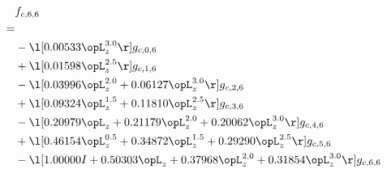 \begin{alignat}{2} 
\label{eq:f_66_0} 
& f_{c,6,6} \nonumber \\ 
 = \\ 
& - \l[  0.00533 \opL_z^{3.0}  \r] g_{c,0,6} \nonumber \\ 
& + \l[  0.01598 \opL_z^{2.5}  \r] g_{c,1,6} \nonumber \\ 
& - \l[  0.03996 \opL_z^{2.0} +  0.06127 \opL_z^{3.0}  \r] g_{c,2,6} \nonumber \\ 
& + \l[  0.09324 \opL_z^{1.5} +  0.11810 \opL_z^{2.5}  \r] g_{c,3,6} \nonumber \\ 
& - \l[  0.20979 \opL_z +  0.21179 \opL_z^{2.0} +  0.20062 \opL_z^{3.0}  \r] g_{c,4,6} \nonumber \\ 
& + \l[  0.46154 \opL_z^{0.5} +  0.34872 \opL_z^{1.5} +  0.29290 \opL_z^{2.5}  \r] g_{c,5,6} \nonumber \\ 
& - \l[  1.00000 I +  0.50303 \opL_z +  0.37968 \opL_z^{2.0} +  0.31854 \opL_z^{3.0}  \r] g_{c,6,6} \nonumber \\ 
\end{alignat} 


